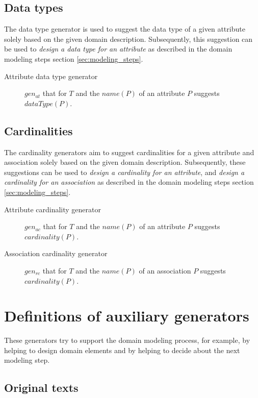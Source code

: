 \subsection{Data types}

The data type generator is used to suggest the data type of a given attribute solely based on the given domain description. Subsequently, this suggestion can be used to \emph{design a data type for an attribute} as described in the domain modeling steps section \ref{sec:modeling_steps}.

\begin{description}
\item [Attribute data type generator] $gen_{at}$ that for $T$ and the $name(P)$ of an attribute $P$ suggests $dataType(P)$.
\end{description}


\subsection{Cardinalities}

The cardinality generators aim to suggest cardinalities for a given attribute and association solely based on the given domain description. Subsequently, these suggestions can be used to \emph{design a cardinality for an attribute}, and \emph{design a cardinality for an association} as described in the domain modeling steps section \ref{sec:modeling_steps}.

\begin{description}
\item [Attribute cardinality generator] $gen_{ac}$ that for $T$ and the $name(P)$ of an attribute $P$ suggests $cardinality(P)$.

\item [Association cardinality generator] $gen_{rc}$ that for $T$ and the $name(P)$ of an association $P$ suggests $cardinality(P)$.
\end{description}


\section{Definitions of auxiliary generators}

These generators try to support the domain modeling process, for example, by helping to design domain elements and by helping to decide about the next modeling step.


\subsection{Original texts}

